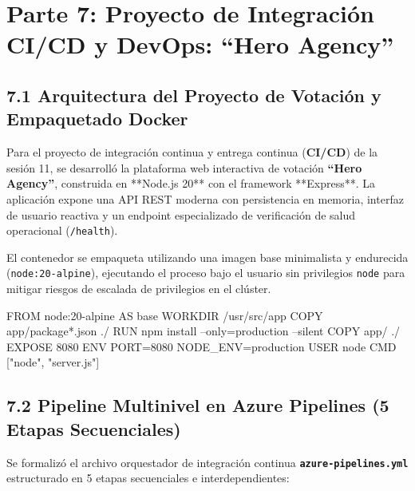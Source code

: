 \section{Parte 7: Proyecto de Integración CI/CD y DevOps: ``Hero Agency''}

\subsection{7.1 Arquitectura del Proyecto de Votación y Empaquetado Docker}
Para el proyecto de integración continua y entrega continua (\textbf{CI/CD}) de la sesión 11, se desarrolló la plataforma web interactiva de votación \textbf{``Hero Agency''}, construida en **Node.js 20** con el framework **Express**. La aplicación expone una API REST moderna con persistencia en memoria, interfaz de usuario reactiva y un endpoint especializado de verificación de salud operacional (\texttt{/health}).

El contenedor se empaqueta utilizando una imagen base minimalista y endurecida (\texttt{node:20-alpine}), ejecutando el proceso bajo el usuario sin privilegios \texttt{node} para mitigar riesgos de escalada de privilegios en el clúster.

\begin{azureterminal}
FROM node:20-alpine AS base
WORKDIR /usr/src/app
COPY app/package*.json ./
RUN npm install --only=production --silent
COPY app/ ./
EXPOSE 8080
ENV PORT=8080 NODE_ENV=production
USER node
CMD ["node", "server.js"]
\end{azureterminal}

\subsection{7.2 Pipeline Multinivel en Azure Pipelines (5 Etapas Secuenciales)}
Se formalizó el archivo orquestador de integración continua \textbf{\texttt{azure-pipelines.yml}} estructurado en 5 etapas secuenciales e interdependientes:

